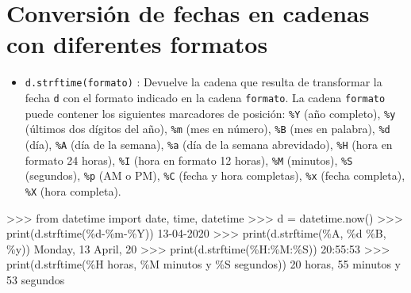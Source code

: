 \documentclass[
  spanish,
  a4paper,
]{scrreport}
\newenvironment{Shaded}{\begin{snugshade}}{\end{snugshade}}
\newcommand{\BuiltInTok}[1]{\textcolor[rgb]{0.00,0.23,0.31}{#1}}
\newcommand{\DecValTok}[1]{\textcolor[rgb]{0.68,0.00,0.00}{#1}}
\newcommand{\ErrorTok}[1]{\textcolor[rgb]{0.68,0.00,0.00}{#1}}
\newcommand{\ImportTok}[1]{\textcolor[rgb]{0.00,0.46,0.62}{#1}}
\newcommand{\NormalTok}[1]{\textcolor[rgb]{0.00,0.23,0.31}{#1}}
\newcommand{\OperatorTok}[1]{\textcolor[rgb]{0.37,0.37,0.37}{#1}}
\newcommand{\SpecialCharTok}[1]{\textcolor[rgb]{0.37,0.37,0.37}{#1}}
\newcommand{\StringTok}[1]{\textcolor[rgb]{0.13,0.47,0.30}{#1}}
\providecommand{\tightlist}{%
  \setlength{\itemsep}{0pt}\setlength{\parskip}{0pt}}
\begin{document}
\section{Conversión de fechas en cadenas con diferentes
formatos}\label{conversiuxf3n-de-fechas-en-cadenas-con-diferentes-formatos}

\begin{itemize}
\tightlist
\item
  \texttt{d.strftime(formato)} : Devuelve la cadena que resulta de
  transformar la fecha \texttt{d} con el formato indicado en la cadena
  \texttt{formato}. La cadena \texttt{formato} puede contener los
  siguientes marcadores de posición: \texttt{\%Y} (año completo),
  \texttt{\%y} (últimos dos dígitos del año), \texttt{\%m} (mes en
  número), \texttt{\%B} (mes en palabra), \texttt{\%d} (día),
  \texttt{\%A} (día de la semana), \texttt{\%a} (día de la semana
  abrevidado), \texttt{\%H} (hora en formato 24 horas), \texttt{\%I}
  (hora en formato 12 horas), \texttt{\%M} (minutos), \texttt{\%S}
  (segundos), \texttt{\%p} (AM o PM), \texttt{\%C} (fecha y hora
  completas), \texttt{\%x} (fecha completa), \texttt{\%X} (hora
  completa).
\end{itemize}

\begin{Shaded}
\begin{Highlighting}[]
\OperatorTok{\textgreater{}\textgreater{}\textgreater{}} \ImportTok{from}\NormalTok{ datetime }\ImportTok{import}\NormalTok{ date, time, datetime}
\OperatorTok{\textgreater{}\textgreater{}\textgreater{}}\NormalTok{ d }\OperatorTok{=}\NormalTok{ datetime.now()}
\OperatorTok{\textgreater{}\textgreater{}\textgreater{}} \BuiltInTok{print}\NormalTok{(d.strftime(}\StringTok{\textquotesingle{}}\SpecialCharTok{\%d}\StringTok{{-}\%m{-}\%Y\textquotesingle{}}\NormalTok{))}
\DecValTok{13}\OperatorTok{{-}}\DecValTok{0}\ErrorTok{4}\OperatorTok{{-}}\DecValTok{2020}
\OperatorTok{\textgreater{}\textgreater{}\textgreater{}} \BuiltInTok{print}\NormalTok{(d.strftime(}\StringTok{\textquotesingle{}\%A, }\SpecialCharTok{\%d}\StringTok{ \%B, \%y\textquotesingle{}}\NormalTok{))}
\NormalTok{Monday, }\DecValTok{13}\NormalTok{ April, }\DecValTok{20}
\OperatorTok{\textgreater{}\textgreater{}\textgreater{}} \BuiltInTok{print}\NormalTok{(d.strftime(}\StringTok{\textquotesingle{}\%H:\%M:\%S\textquotesingle{}}\NormalTok{))}
\DecValTok{20}\NormalTok{:}\DecValTok{55}\NormalTok{:}\DecValTok{53}
\OperatorTok{\textgreater{}\textgreater{}\textgreater{}} \BuiltInTok{print}\NormalTok{(d.strftime(}\StringTok{\textquotesingle{}\%H horas, \%M minutos y \%S segundos\textquotesingle{}}\NormalTok{))}
\DecValTok{20}\NormalTok{ horas, }\DecValTok{55}\NormalTok{ minutos y }\DecValTok{53}\NormalTok{ segundos}
\end{Highlighting}
\end{Shaded}
\end{document}
